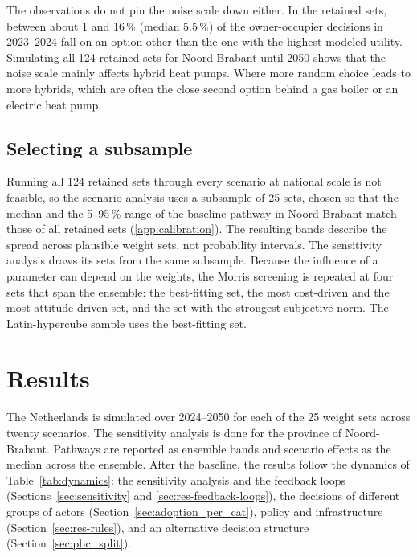 \documentclass[preprint,12pt,authoryear]{elsarticle}
\begin{document}
The observations do not pin the noise scale down either. In the retained
sets, between about 1 and 16\,\% (median 5.5\,\%) of the owner-occupier
decisions in 2023--2024 fall on an option other than the one with the highest
modeled utility. Simulating all 124 retained sets for Noord-Brabant until
2050 shows that the noise scale mainly affects hybrid heat pumps. Where more random
choice leads to more hybrids, which are often the close second option behind
a gas boiler or an electric heat pump.

\subsection{Selecting a subsample}
\label{sec:subsample}
Running all 124 retained sets through every scenario at national scale is not
feasible, so the scenario analysis uses a subsample of 25 sets, chosen so
that the median and the 5--95\,\% range of the baseline pathway in
Noord-Brabant match those of all retained sets (\ref{app:calibration}). The
resulting bands describe the spread across plausible weight sets, not
probability intervals. The sensitivity analysis draws its sets from the same
subsample. Because the influence of a parameter can depend on the weights,
the Morris screening is repeated at four sets that span the ensemble: the
best-fitting set, the most cost-driven and the most attitude-driven set, and
the set with the strongest subjective norm. The Latin-hypercube sample uses
the best-fitting set.

\section{Results}
\label{sec:results}
The Netherlands is simulated over 2024--2050 for each of the 25 weight sets
across twenty scenarios. The sensitivity analysis is done for the province of
Noord-Brabant. Pathways are reported as ensemble bands and scenario effects
as the median across the ensemble. After the baseline, the results follow the
dynamics of Table~\ref{tab:dynamics}: the sensitivity analysis and the
feedback loops (Sections~\ref{sec:sensitivity} and
\ref{sec:res-feedback-loops}), the decisions of different groups of actors
(Section~\ref{sec:adoption_per_cat}), policy and infrastructure
(Section~\ref{sec:res-rules}), and an alternative decision structure
(Section~\ref{sec:pbc_split}).
\end{document}
